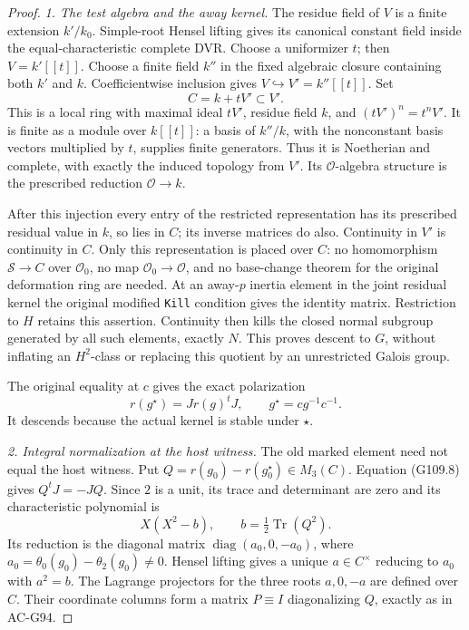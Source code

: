 \begin{proof}
\emph{1. The test algebra and the away kernel.}
The residue field of \(V\) is a finite extension \(k'/k_0\).
Simple-root Hensel lifting gives its canonical constant field
inside the equal-characteristic complete DVR.  Choose a
uniformizer \(t\); then \(V=k'[[t]]\).
Choose a finite field \(k''\) in the fixed algebraic closure
containing both \(k'\) and \(k\).  Coefficientwise inclusion gives
\(V\hookrightarrow V'=k''[[t]]\).  Set
\[
                 C=k+tV'\subset V'.
 \tag{G109.7}
\]
This is a local ring with maximal ideal \(tV'\), residue field
\(k\), and \((tV')^n=t^nV'\).  It is finite as a module over
\(k[[t]]\): a basis of \(k''/k\), with the nonconstant basis
vectors multiplied by \(t\), supplies finite generators.
Thus it is Noetherian and complete, with exactly the induced
topology from \(V'\).  Its \(\mathcal O\)-algebra structure is
the prescribed reduction \(\mathcal O\to k\).

After this injection every entry of the restricted representation
has its prescribed residual value in \(k\), so lies in \(C\);
its inverse matrices do also.  Continuity in \(V'\) is continuity
in \(C\).  Only this representation is placed over \(C\):
no homomorphism \(\mathscr S\to C\) over \(\mathcal O_0\),
no map \(\mathcal O_0\to\mathcal O\), and no base-change theorem
for the original deformation ring are needed.
At an away-\(p\) inertia
element in the joint residual kernel the original modified
\texttt{Kill} condition gives the identity matrix.  Restriction
to \(H\) retains this assertion.  Continuity then kills the
closed normal subgroup generated by all such elements, exactly
\(N\).  This proves descent to \(G\), without inflating an
\(H^2\)-class or replacing this quotient by an unrestricted
Galois group.

The original equality at \(c\) gives the exact polarization
\[
       r(g^\star)=Jr(g)^tJ,\qquad g^\star=cg^{-1}c^{-1}.
 \tag{G109.8}
\]
It descends because the actual kernel is stable under \(\star\).

\emph{2. Integral normalization at the host witness.}
The old marked element need not equal the host witness.
Put \(Q=r(g_0)-r(g_0^\star)\in M_3(C)\).
Equation (G109.8) gives \(Q^tJ=-JQ\).  Since \(2\) is a unit,
its trace and determinant are zero and its characteristic
polynomial is
\[
       X(X^2-b),\qquad b=\tfrac12\operatorname{Tr}(Q^2).
 \tag{G109.9}
\]
Its reduction is the diagonal matrix
\(\operatorname{diag}(a_0,0,-a_0)\), where
\(a_0=\theta_0(g_0)-\theta_2(g_0)\ne0\).
Hensel lifting gives a unique \(a\in C^\times\) reducing to
\(a_0\) with \(a^2=b\).  The Lagrange projectors for the
three roots \(a,0,-a\) are defined over \(C\).
Their coordinate columns form a matrix \(P\equiv I\)
diagonalizing \(Q\), exactly as in AC-G94.


\end{proof}
